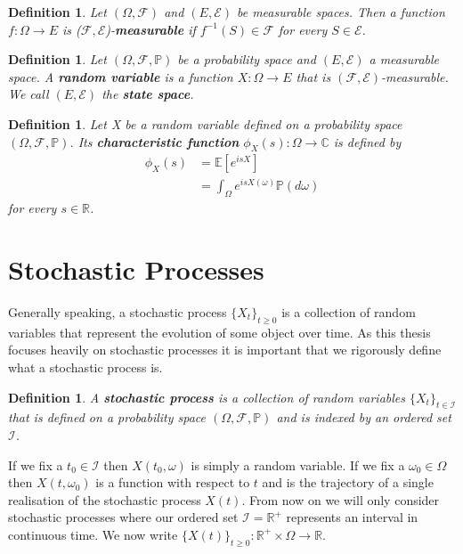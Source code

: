 \documentclass[honours,12pt]{UNSWthesis}
\newcommand{\R}{\mathbb{R}}
\newcommand{\C}{\mathbb{C}}
\newcommand{\PP}{\mathbb{P}}
\newcommand{\E}{\mathbb{E}}
\newcommand{\Rp}{\mathbb R^+}
\newcommand{\1}{\mathbf 1}
\newcommand{\FF}{\mathcal{F}}
\newtheorem{definition}[theorem]{Definition}
\numberwithin{equation}{section}
\theoremstyle{definition}
\theoremstyle{remark}
\begin{document}
\begin{definition}
Let $(\Omega,\FF)$ and $(E,\mathcal{E})$ be measurable spaces. Then a function $f: \Omega \rightarrow E$ is ($\FF,\mathcal{E}$)-\textbf{measurable} if $f^{-1}(S)\in \FF$ for every $S\in \mathcal{E}$.\\
\end{definition}

\begin{definition}
Let $(\Omega,\FF,\PP)$ be a probability space and $(E,\mathcal{E})$ a measurable space. A \textbf{random variable} is a function $X:\Omega \rightarrow E$ that is $(\FF,\mathcal{E})$-measurable. We call $(E,\mathcal{E})$ the \textbf{state space}. \\
\end{definition}

\begin{definition}
	Let X be a random variable defined on a probability space $(\Omega,\FF,\PP)$. Its \textbf{characteristic function} $\phi_X(s):\Omega\to\C$ is defined by 
	\begin{align*}
		\phi_X(s)&=\E[e^{isX}]\\
		&=\int_\Omega e^{isX(\omega)} \PP(d\omega)
	\end{align*}
	for every $s \in \R$.
\end{definition}

\section{Stochastic Processes}
Generally speaking, a stochastic process $\{X_t\}_{t\geq 0}$ is a collection of random variables that represent the evolution of some object over time. As this thesis focuses heavily on stochastic processes it is important that we rigorously define what a stochastic process is.\\

\begin{definition}
A \textbf{stochastic process} is a collection of random variables $\{X_t\}_{t\in \mathcal{I}}$ that is defined on a probability space $(\Omega, \FF,\PP)$ and is indexed by an ordered set $\mathcal{I}$. \\
\end{definition}

\noindent If we fix a $t_0\in \mathcal{I}$ then $X(t_0,\omega)$ is simply a random variable. If we fix a $\omega_0\in \Omega$ then $X(t,\omega_0)$ is a function with respect to $t$ and is the trajectory of a single realisation of the stochastic process $X(t)$. From now on we will only consider stochastic processes where our ordered set $\mathcal{I}=\Rp$ represents an interval in continuous time. We now write $\{X(t)\}_{t\geq 0}:\Rp\times\Omega\to\R$.\\ 
\end{document}
